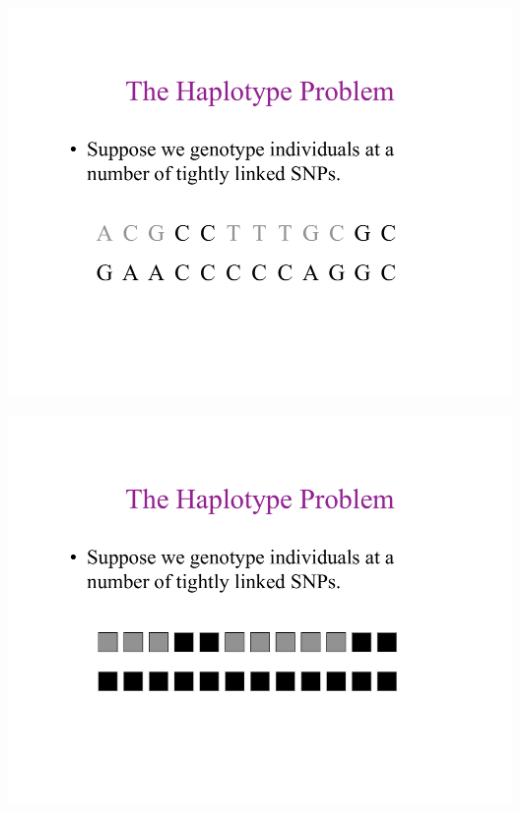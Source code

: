 \newslide{}
\mbox{}
\vspace*{\VertUp}
\enlargethispage*{1000pt}
\begin{center}
\includegraphics*[width=\textwidth]{PPT_pages/pg_0003.pdf}
\end{center}


\newslide{}
\mbox{}
\vspace*{\VertUp}
\enlargethispage*{1000pt}
\begin{center}
\includegraphics*[width=\textwidth]{PPT_pages/pg_0004.pdf}
\end{center}


